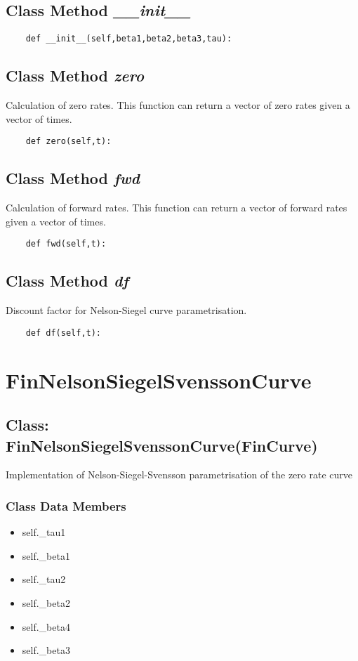 \documentclass[twoside,11pt]{book}
\begin{document}
\subsection{Class Method {\it \_\_init\_\_}}


\begin{lstlisting}
    def __init__(self,beta1,beta2,beta3,tau):
\end{lstlisting}

\subsection{Class Method {\it zero}}
Calculation of zero rates. This function can return a vector of zero rates given a vector of times. 

\begin{lstlisting}
    def zero(self,t):
\end{lstlisting}

\subsection{Class Method {\it fwd}}
Calculation of forward rates. This function can return a vector of forward rates given a vector of times. 

\begin{lstlisting}
    def fwd(self,t):
\end{lstlisting}

\subsection{Class Method {\it df}}
Discount factor for Nelson-Siegel curve parametrisation. 

\begin{lstlisting}
    def df(self,t):
\end{lstlisting}

\newpage
\section{FinNelsonSiegelSvenssonCurve}

\subsection{Class: FinNelsonSiegelSvenssonCurve(FinCurve)}
Implementation of Nelson-Siegel-Svensson parametrisation of the zero rate curve 

\subsubsection{Class Data Members}
\begin{itemize}
\item{self.\_tau1}
\item{self.\_beta1}
\item{self.\_tau2}
\item{self.\_beta2}
\item{self.\_beta4}
\item{self.\_beta3}
\end{itemize}
\end{document}
